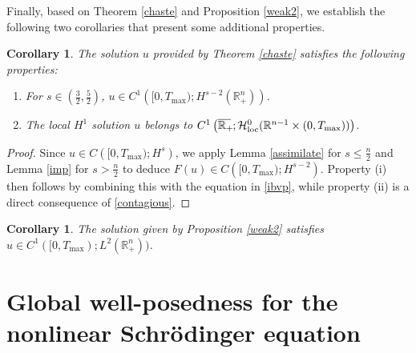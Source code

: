 \documentclass[preprint,compress,12pt]{elsarticle}
\newtheorem{corollary}[theorem]{Corollary}
\numberwithin{equation}{section}
\begin{document}
Finally, based on Theorem \ref{chaste} and Proposition \ref{weak2}, we establish the following two corollaries that present some additional properties.
\begin{corollary}\label{core}
	The solution $u$ provided by Theorem \ref{chaste} satisfies the following properties:
	\begin{enumerate}[label=(\roman*)]
		\item For $s\in \left(\frac{3}{2},\frac{5}{2}\right)$, $u\in C^{1}\left([0,T_{\max});H^{s-2}(\mathbb{R}^{n}_{+})\right)$.
		\item The local $H^{1}$ solution $u$ belongs to $C^{1} \left(\overline{\mathbb{R}_{+}\mkern-4mu}\,; \mathcal{H}^{0}_{\mathrm{loc}}(\mathbb{R}^{n-1}\times (0,T_{\max}))\right)$.
	\end{enumerate}
\end{corollary}
\begin{proof}
	Since $u\in C\left([0,T_{\max});H^{s}\right)$, we apply Lemma \ref{assimilate} for $s\leq \frac{n}{2}$ and Lemma \ref{imp} for $s>\frac{n}{2}$ to deduce  $F(u)\in C\left([0,T_{\max});H^{s-2}\right)$.
	Property (i) then follows by combining this with the equation in \eqref{ibvp}, while property (ii) is a direct consequence of \eqref{contagious}.
\end{proof}
\begin{corollary}\label{core1}
	The solution given by Proposition \ref{weak2} satisfies $u\in C^{1}([0,T_{\max});L^{2}(\mathbb{R}^{n}_{+}))$.
\end{corollary}

\section{Global well-posedness for the nonlinear Schr\"{o}dinger equation}\label{sec4}
\end{document}
